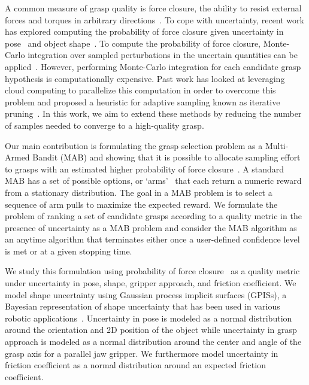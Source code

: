 \documentclass[10pt, conference]{ieeeconf}      %
\begin{document}
A common measure of grasp quality is force closure, the ability to resist external forces and torques in arbitrary directions~\cite{li1988task}. To cope with uncertainty, recent work has explored computing the probability of force closure given uncertainty in pose~\cite{christopoulos2007handling, kim2012physically, weisz2012pose} and object shape~\cite{kehoe2012estimating, mahler2015gp}.
To compute the probability of force closure, Monte-Carlo integration over sampled perturbations in the uncertain
quantities can be applied~\cite{christopoulos2007handling,kehoe2012toward, kim2012physically, weisz2012pose}. However,
performing Monte-Carlo integration for each candidate grasp hypothesis is computationally expensive.  Past work has
looked at leveraging cloud computing to parallelize this computation in order to overcome this problem and proposed a heuristic for adaptive sampling known as iterative pruning~\cite{kehoe2012estimating,kehoe2012toward,kehoe2015survey}.
In this work, we aim to extend these methods by reducing the number of samples needed to converge to a high-quality grasp.  

Our main contribution is formulating the grasp selection problem as a Multi-Armed Bandit (MAB) and showing that it is possible to
allocate sampling effort to grasps with an estimated higher probability of force closure~\cite{barto1998reinforcement,
lai1985asymptotically, robbins1985some}. A standard MAB has a set of possible options, or
`arms'~\cite{barto1998reinforcement} that each return a numeric reward from a stationary distribution. The goal in a
MAB problem is to  select a sequence of arm pulls to maximize the expected reward. We formulate the problem of ranking a
set of candidate grasps according to a quality metric in the presence of uncertainty as a MAB problem and consider the
MAB algorithm as an anytime algorithm that terminates either once a user-defined confidence level is met or at a given stopping time. 

We study this formulation using probability of force closure~\cite{christopoulos2007handling,  kehoe2012toward,weisz2012pose} as a quality metric under uncertainty in pose, shape, gripper approach, and friction coefficient. 
We model shape uncertainty using Gaussian process implicit surfaces (GPISs), a Bayesian representation of shape uncertainty that has been used in various robotic applications~\cite{dragiev2011, hollinger2013}. 
Uncertainty in pose is modeled as a normal distribution around the orientation and 2D position of the object while
uncertainty in grasp approach is modeled as a normal distribution around the center and angle of the grasp axis for a
parallel jaw gripper. We furthermore model uncertainty in friction coefficient as a normal distribution around an expected friction coefficient.
\end{document}
